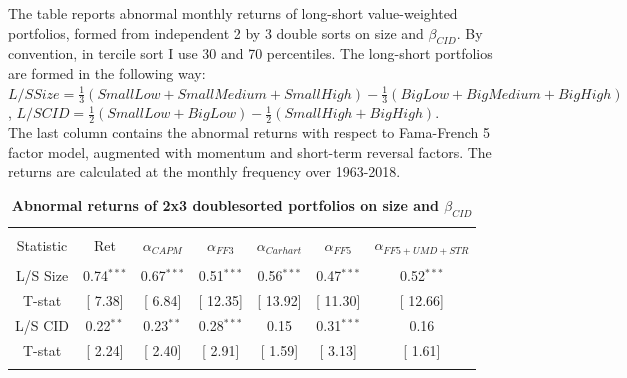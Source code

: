 \documentclass[12pt]{article}
\begin{document}
\begin{table}[!htbp] \centering 
  \caption{\textbf{Abnormal returns of 2x3 doublesorted portfolios on size and $\beta_{CID}$}}
  \label{} 
  \begin{flushleft}
    {\medskip\small
 The table reports abnormal monthly returns of long-short value-weighted portfolios, formed from independent 2 by 3 double sorts on size and $\beta_{CID}$. By convention, in tercile sort I use 30 and 70 percentiles. The long-short portfolios are formed in the following way:
 $L/S Size = \frac{1}{3}(SmallLow+SmallMedium+SmallHigh) - \frac{1}{3}(BigLow+BigMedium+BigHigh)$,
 $L/S CID = \frac{1}{2}(SmallLow+BigLow) - \frac{1}{2}(SmallHigh+BigHigh)$. \\
 The last column contains the abnormal returns with respect to Fama-French 5 factor model, augmented with momentum and short-term reversal factors. The returns are calculated at the monthly frequency over 1963-2018.}
    \medskip
    \end{flushleft}
\begin{tabular}{@{\extracolsep{5pt}} ccccccc} 
\\[-1.8ex]\hline 
\hline \\[-1.8ex] 
Statistic & Ret & $\alpha_{CAPM}$ & $\alpha_{FF3}$ & $\alpha_{Carhart}$ & $\alpha_{FF5}$ & $\alpha_{FF5+UMD+STR}$ \\ 
\hline \\[-1.8ex] 
L/S Size & 0.74$^{***}$ & 0.67$^{***}$ & 0.51$^{***}$ & 0.56$^{***}$ & 0.47$^{***}$ & 0.52$^{***}$ \\ 
T-stat & [ 7.38] & [ 6.84] & [ 12.35] & [ 13.92] & [ 11.30] & [ 12.66] \\ 
L/S CID & 0.22$^{**}$ & 0.23$^{**}$ & 0.28$^{***}$ & 0.15 & 0.31$^{***}$ & 0.16 \\ 
T-stat & [ 2.24] & [ 2.40] & [ 2.91] & [ 1.59] & [ 3.13] & [ 1.61] \\ 
\hline \\[-1.8ex] 
\end{tabular} 
\end{table}
\end{document}
